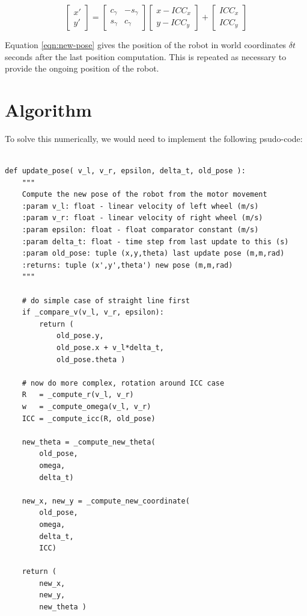 \documentclass[11pt]{article}
\begin{document}
\begin{equation}
\begin{bmatrix}x'\\y'\end{bmatrix} = %
\begin{bmatrix}
c_{\gamma} & -s_{\gamma} \\
s_{\gamma} &  c_{\gamma}
\end{bmatrix}
\begin{bmatrix}
x - ICC_x \\
y - ICC_y
\end{bmatrix} +
\begin{bmatrix}
ICC_x\\
ICC_y
\end{bmatrix}
\label{eqn:new-pose}
\end{equation}

Equation \ref{eqn:new-pose} gives the position of the robot in world coordinates $\delta t$ seconds after the last position
computation. This is repeated as necessary to provide the ongoing position of the robot.

\newpage
\appendix
\section{Algorithm}

To solve this numerically, we would need to implement the following psudo-code:
\begin{lstlisting}

def update_pose( v_l, v_r, epsilon, delta_t, old_pose ):
    """
    Compute the new pose of the robot from the motor movement
    :param v_l: float - linear velocity of left wheel (m/s)
    :param v_r: float - linear velocity of right wheel (m/s)
    :param epsilon: float - float comparator constant (m/s)
    :param delta_t: float - time step from last update to this (s)
    :param old_pose: tuple (x,y,theta) last update pose (m,m,rad)
    :returns: tuple (x',y',theta') new pose (m,m,rad)
    """

    # do simple case of straight line first
    if _compare_v(v_l, v_r, epsilon):
        return (
            old_pose.y,
            old_pose.x + v_l*delta_t,
            old_pose.theta )

    # now do more complex, rotation around ICC case
    R   = _compute_r(v_l, v_r)
    w   = _compute_omega(v_l, v_r)
    ICC = _compute_icc(R, old_pose)

    new_theta = _compute_new_theta(
        old_pose,
        omega,
        delta_t)

    new_x, new_y = _compute_new_coordinate(
        old_pose, 
        omega, 
        delta_t, 
        ICC)

    return (
        new_x,
        new_y,
        new_theta )
\end{lstlisting}
\end{document}
